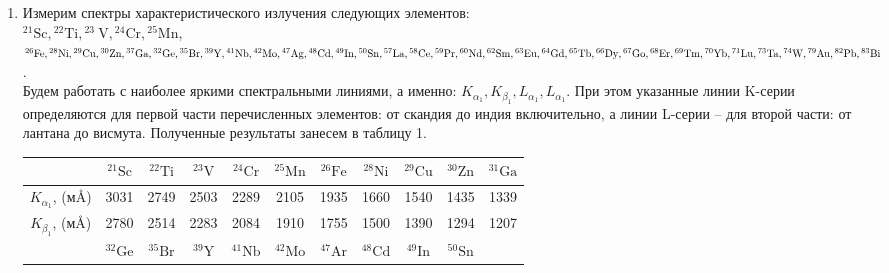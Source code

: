 \documentclass[a4paper, 12pt]{article}%
\begin{document}
	\begin{enumerate}
		
		\item Измерим спектры характеристического излучения следующих элементов: \\
		 ${ }^{21} \mathrm{Sc},{ }^{22} \mathrm{Ti},{ }^{23} \mathrm{~V},{ }^{24} \mathrm{Cr},{ }^{25} \mathrm{Mn}$, ${ }^{26} \mathrm{Fe},{ }^{28} \mathrm{Ni},{ }^{29} \mathrm{Cu}, { }^{30} \mathrm{Zn},{ }^{37} \mathrm{Ga},{ }^{32} \mathrm{Ge},{ }^{35} \mathrm{Br},{ }^{39} \mathrm{Y},{ }^{41} \mathrm{Nb},{ }^{42} \mathrm{Mo}, \\{ }^{47} \mathrm{Ag},{ }^{48} \mathrm{Cd},{ }^{49} \mathrm{In},{ }^{50} \mathrm{Sn},{ }^{57} \mathrm{La},{ }^{58} \mathrm{Ce},{ }^{59} \mathrm{Pr},{ }^{60} \mathrm{Nd},{ }^{62} \mathrm{Sm},{ }^{63} \mathrm{Eu},{ }^{64} \mathrm{Gd}, { }^{65} \mathrm{Tb},{ }^{66} \mathrm{Dy},{ }^{67} \mathrm{Go},{ }^{68} \mathrm{Er},\\{ }^{69} \mathrm{Tm},{ }^{70} \mathrm{Yb},{ }^{71} \mathrm{Lu},{ }^{73} \mathrm{Ta},{ }^{74} \mathrm{W},{ }^{79} \mathrm{Au},{ }^{82} \mathrm{Pb},{ }^{83} \mathrm{Bi}$ .\\
		 
		 
		 Будем работать с наиболее яркими спектральными линиями,
		 а именно: $K_{\alpha_1}, K_{\beta_1}, L_{\alpha_1}, L_{\alpha_1}$. При этом указанные линии K-серии определяются для первой части перечисленных элементов: от скандия до индия включительно, а линии L-серии – для второй
		 части: от лантана до висмута.
		 Полученные результаты занесем в таблицу 1.
		 
		 
		 	\begin{longtable}{|c|c|c|c|c|c|c|c|c|c|c|}
		 		\hline
		 		& ${ }^{21} \mathrm{Sc}$ & ${ }^{22} \mathrm{Ti}$ & ${}^{23} \mathrm{V}$ & ${ }^{24} \mathrm{Cr}$ & ${ }^{25} \mathrm{Mn}$ & ${ }^{26} \mathrm{Fe}$ & ${ }^{28} \mathrm{Ni}$ & ${ }^{29} \mathrm{Cu}$ & ${ }^{30} \mathrm{Zn}$ & ${ }^{31} \mathrm{Ga}$ \\ \hline
		 		
		 		$K_{\alpha_1}$, (м\AA) & 3031 & 2749 & 2503 & 2289 & 2105 & 1935 & 1660 & 1540 & 1435 & 1339 \\ \hline
		 		$K_{\beta_1}$, (м\AA) & 2780 & 2514 & 2283 & 2084 & 1910 & 1755 & 1500 & 1390 & 1294 & 1207 \\ \hline
		 		\hline
		 		& ${ }^{32} \mathrm{Ge}$ & ${}^{35} \mathrm{Br}$ & ${ }^{39} \mathrm{Y}$ & ${ }^{41} \mathrm{Nb}$ & ${ }^{42} \mathrm{Mo}$ & ${ }^{47} \mathrm{Ar}$ & ${ }^{48} \mathrm{Cd}$ & ${ }^{49} \mathrm{In}$ & ${ }^{50} \mathrm{Sn}$ & \\ \hline
		 		

\end{longtable}
\end{enumerate}
\end{document}
